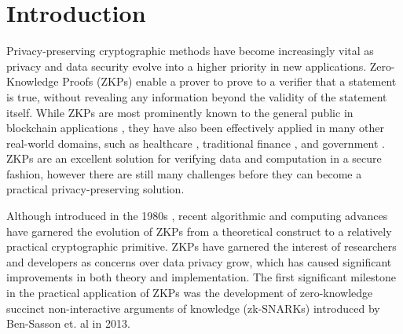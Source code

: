 \section{Introduction}

Privacy-preserving cryptographic methods have become increasingly vital as privacy and data security evolve into a higher priority in new applications. Zero-Knowledge Proofs (ZKPs) enable a prover \Prv to prove to a verifier \Vrf that a statement is true, without revealing any information beyond the validity of the statement itself. While ZKPs are most prominently known to the general public in blockchain applications \cite{boo2021litezkp, chainOverviewZeroKnowledge, binanceWhatZeroknowledge, vcapko2022state}, they have also been effectively applied in many other real-world domains, such as healthcare \cite{tomaz2020preserving, sharma2020blockchain, gaba2022zero}, traditional finance \cite{rabin2012strictly, thorpe2009zero, lin2021efficient}, and government \cite{bamberger2022verification, landau1988zero}. ZKPs are an excellent solution for verifying data and computation in a secure fashion, however there are still many challenges before they can become a practical privacy-preserving solution.

Although introduced in the 1980s \cite{goldwasser2019knowledge}, recent algorithmic and computing advances have garnered the evolution of ZKPs from a theoretical construct to a relatively practical cryptographic primitive. ZKPs have garnered the interest of researchers and developers as concerns over data privacy grow, which has caused significant improvements in both theory and implementation. The first significant milestone in the practical application of ZKPs was the development of zero-knowledge succinct non-interactive arguments of knowledge (zk-SNARKs) introduced by Ben-Sasson et. al \cite{ben2014succinct} in 2013. 


